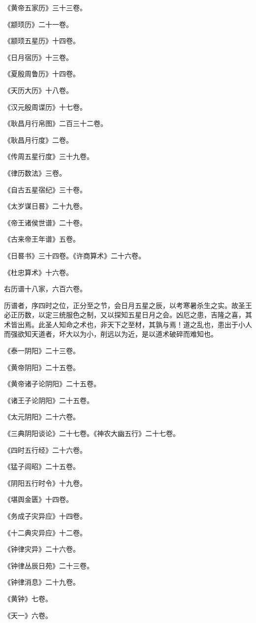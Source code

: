 \documentclass[]{article}
\begin{document}
《黄帝五家历》三十三卷。

《颛顼历》二十一卷。

《颛顼五星历》十四卷。

《日月宿历》十三卷。

《夏殷周鲁历》十四卷。

《天历大历》十八卷。

《汉元殷周谍历》十七卷。

《耿昌月行帛图》二百三十二卷。

《耿昌月行度》二卷。

《传周五星行度》三十九卷。

《律历数法》三卷。

《自古五星宿纪》三十卷。

《太岁谋日晷》二十九卷。

《帝王诸侯世谱》二十卷。

《古来帝王年谱》五卷。

《日晷书》三十四卷。《许商算术》二十六卷。

《杜忠算术》十六卷。

右历谱十八家，六百六卷。

历谱者，序四时之位，正分至之节，会日月五星之辰，以考寒暑杀生之实。故圣王必正历数，以定三统服色之制，又以探知五星日月之会。凶厄之患，吉隆之喜，其术皆出焉。此圣人知命之术也，非天下之至材，其孰与焉！道之乱也，患出于小人而强欲知天道者，坏大以为小，削远以为近，是以道术破碎而难知也。

《泰一阴阳》二十三卷。

《黄帝阴阳》二十五卷。

《黄帝诸子论阴阳》二十五卷。

《诸王子论阴阳》二十五卷。

《太元阴阳》二十六卷。

《三典阴阳谈论》二十七卷。《神农大幽五行》二十七卷。

《四时五行经》二十六卷。

《猛子闾昭》二十五卷。

《阴阳五行时令》十九卷。

《堪舆金匮》十四卷。

《务成子灾异应》十四卷。

《十二典灾异应》十二卷。

《钟律灾异》二十六卷。

《钟律丛辰日苑》二十三卷。

《钟律消息》二十九卷。

《黄钟》七卷。

《天一》六卷。
\end{document}
